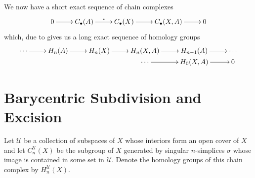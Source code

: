 We now have a short exact sequence of chain complexes
\begin{equation*}
    \xymatrix {
        0\ar[r] & C_\bullet(A)\ar[r]^\iota & C_\bullet(X)\ar[r] & C_\bullet(X,A)\ar[r] & 0
    }
\end{equation*}
which, due to  gives us a long exact sequence of homology groups
\begin{equation*}
\xymatrix@R-2pc{
    \cdots\ar[r] & H_n(A)\ar[r] & H_n(X)\ar[r] & H_n(X,A)\ar[r] & H_{n - 1}(A)\ar[r] & \cdots\\
    & & &  \cdots\ar[r] & H_0(X,A)\ar[r] & 0
}
\end{equation*}

\section{Barycentric Subdivision and Excision}

\begin{definition}
    Let $\mathscr U$ be a collection of subspaces of $X$ whose interiors form an open cover of $X$ and let $C_n^{\mathscr U}(X)$ be the subgroup of $X$ generated by singular $n$-simplices $\sigma$ whose image is contained in some set in $\mathscr{U}$. Denote the homology groups of this chain complex by $H_n^\mathscr{U}(X)$.
\end{definition}

